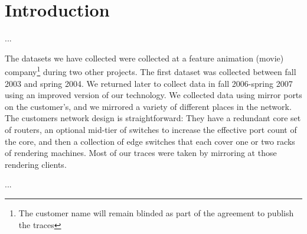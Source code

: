 \section{Introduction}

...

The datasets we have collected were collected at a feature animation
(movie) company\footnote{The customer name will remain blinded as part
of the agreement to publish the traces} during two other projects.
The first dataset was collected between fall 2003 and spring 2004.  We
returned later to collect data in fall 2006-spring 2007 using an
improved version of our technology.  We collected data using mirror
ports on the customer's, and we mirrored a variety of different places
in the network.  The customers network design is straightforward: They
have a redundant core set of routers, an optional mid-tier of switches
to increase the effective port count of the core, and then a
collection of edge switches that each cover one or two racks of
rendering machines.  Most of our traces were taken by mirroring at
those rendering clients.

...

